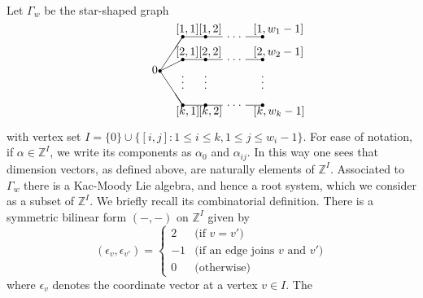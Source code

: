 \documentclass{amsart}
\theoremstyle{plain}
\theoremstyle{definition}
\theoremstyle{remark}
\newcommand{\Z}{\mathbb{Z}}
\begin{document}
Let $\Gamma_w$ be the star-shaped graph
\setlength{\unitlength}{1.5pt}
\[
\begin{picture}(110,80)
\put(10,40){\circle*{2.5}}
\put(30,10){\circle*{2.5}}
\put(30,50){\circle*{2.5}}
\put(30,70){\circle*{2.5}}
\put(50,10){\circle*{2.5}}
\put(50,50){\circle*{2.5}}
\put(50,70){\circle*{2.5}}
\put(100,10){\circle*{2.5}}
\put(100,50){\circle*{2.5}}
\put(100,70){\circle*{2.5}}
\put(10,40){\line(2,-3){20}}
\put(10,40){\line(2,1){20}}
\put(10,40){\line(2,3){20}}
\put(30,10){\line(1,0){35}}
\put(30,50){\line(1,0){35}}
\put(30,70){\line(1,0){35}}
\put(85,10){\line(1,0){15}}
\put(85,50){\line(1,0){15}}
\put(85,70){\line(1,0){15}}
\put(70,10){\circle*{1}}
\put(75,10){\circle*{1}}
\put(80,10){\circle*{1}}
\put(70,50){\circle*{1}}
\put(75,50){\circle*{1}}
\put(80,50){\circle*{1}}
\put(70,70){\circle*{1}}
\put(75,70){\circle*{1}}
\put(80,70){\circle*{1}}
\put(30,25){\circle*{1}}
\put(30,30){\circle*{1}}
\put(30,35){\circle*{1}}
\put(50,25){\circle*{1}}
\put(50,30){\circle*{1}}
\put(50,35){\circle*{1}}
\put(100,25){\circle*{1}}
\put(100,30){\circle*{1}}
\put(100,35){\circle*{1}}
\put(3,38){0}
\put(24,2){$[k,1]$}
\put(24,54){$[2,1]$}
\put(24,74){$[1,1]$}
\put(44,2){$[k,2]$}
\put(44,54){$[2,2]$}
\put(44,74){$[1,2]$}
\put(92,2){$[k,w_k-1]$}
\put(92,54){$[2,w_2-1]$}
\put(92,74){$[1,w_1-1]$}
\end{picture}
\]
with vertex set $I = \{ 0 \} \cup \{ [i,j] : 1\le i\le k, 1\le j\le w_i-1 \}$.
For ease of notation, if $\alpha\in\Z^I$, we write its components as $\alpha_0$ and $\alpha_{ij}$.
In this way one sees that dimension vectors, as defined above, are naturally elements of $\Z^I$.
Associated to $\Gamma_w$ there is a Kac-Moody Lie algebra, and hence a root system, which we
consider as a subset of $\Z^I$. We briefly recall its combinatorial definition. There is a
symmetric bilinear form $(-,-)$ on $\Z^I$ given by
\[
(\epsilon_v,\epsilon_{v'}) = \begin{cases}
2 & \text{(if $v=v'$)} \\
-1 & \text{(if an edge joins $v$ and $v'$)} \\
0 & \text{(otherwise)}
\end{cases}
\]
where $\epsilon_v$ denotes the coordinate vector at a vertex $v\in I$. The
\end{document}
